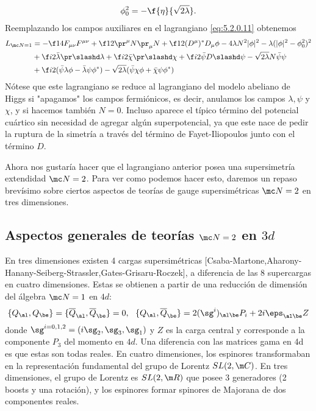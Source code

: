 \begin{align}
	\phi_0^2 = -\f{\eta}{\sqrt{2\lambda}}.
\end{align}
Reemplazando los campos auxiliares en el lagrangiano \eqref{eq:5.2.0.11} obtenemos
\begin{align}
	L_{\mc N=1} &= -\f 14 F_{\mu\nu}F^{\mu\nu}+\f 12\pr^\mu N\pr_\mu N+\f 12(D^\mu)^* D_\mu\phi-4\lambda N^2|\phi|^2-\lambda (|\phi|^2-\phi_0^2)^2\nonumber\\
	&+\f i2\bar\lambda\pr\slashd\lambda+\f i2\bar\chi\pr\slashd\chi+\f i2\bar\psi D\slashd\psi-\sqrt{2\lambda}N\bar\psi\psi\nonumber\\
	&+\f i2(\bar\psi\lambda\phi-\bar\lambda\psi\phi^*)-\sqrt{2\lambda}(\bar\psi\chi\phi+\bar\chi\psi\phi^*) \label{eq:5.2.0.15}
\end{align}
Nótese que este lagrangiano se reduce al lagrangiano del modelo abeliano de Higgs si "apagamos" los campos fermiónicos, es decir, anulamos los campos $\lambda,\psi$ y $\chi$, y  si hacemos también $N=0$. Incluso aparece el típico término del potencial cuártico sin necesidad de agregar algún superpotencial, ya que este nace de pedir la ruptura de la simetría a través del término de Fayet-Iliopoulos junto con el término $D$.

Ahora nos gustaría hacer que el lagrangiano anterior posea una supersimetría extendidad $\mc N=2$. Para ver como podemos hacer esto, daremos un repaso brevísimo sobre ciertos aspectos de teorías de gauge supersimétricas $\mc N=2$ en tres dimensiones.

\subsection{Aspectos generales de teorías $\mc N=2$ en $3d$}

En tres dimensiones existen 4 cargas supersimétricas [Csaba-Martone,Aharony-Hanany-Seiberg-Strassler,Gates-Grisaru-Roczek], a diferencia de las 8 supercargas en cuatro dimensiones. Estas se obtienen a partir de una reducción de dimensión del álgebra $\mc N=1$ en $4d$:
\begin{align}
	\{Q_\al,Q_\be\} = \{\overline Q_\al,\overline Q_\be\} =0, \ \ \{Q_\al,\overline Q_\be\} = 2(\sg^i)_{\al\be}P_i+2i\eps_{\al\be}Z
\end{align}
donde $\sg^{i=0,1,2}=(i\sg_2,\sg_3,\sg_1)$ y $Z$ es la carga central y corresponde a la componente $P_3$ del momento en $4d$. Una diferencia con las matrices gama en 4d es que estas son todas reales. En cuatro dimensiones, los espinores transformaban en la representación fundamental del grupo de Lorentz $SL(2,\m C)$. En tres dimensiones, el grupo de Lorentz es $SL(2,\m R)$ que posee 3 generadores (2 boosts y una rotación), y los espinores formar spinores de Majorana de dos componentes reales.

